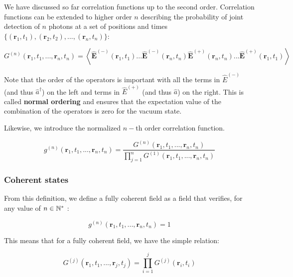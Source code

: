 We have discussed so far correlation functions up to the second order. Correlation functions can be extended to higher order $n$ describing the probability of joint detection of $n$ photons at a set of positions and times $\{(\bm{r}_1,t_1),(\bm{r}_2,t_2),...,(\bm{r}_n,t_n)\}$: 

\begin{equation}
    G^{(n)}\left(\bm{r}_{1}, t_{1}, ... , \bm{r}_{n}, t_{n}\right)=\left\langle \hat{\bm{E}}^{(-)}\left(\bm{r}_{1}, t_{1}\right) ... \hat{\bm{E}}^{(-)}\left(\bm{r}_{n}, t_{n}\right) \hat{\bm{E}}^{(+)}\left(\bm{r}_{n}, t_{n}\right) ... \hat{\bm{E}}^{(+)}\left(\bm{r}_{1}, t_{1}\right)\right\rangle
\end{equation}

\label{sec:normal_order}
\noindent Note that the order of the operators is important with all the terms in $\hat{E}^{(-)}$ (and thus $\hat{a}^{\dagger}$) on the left and terms in $\hat{E}^{(+)}$ (and thus $\hat{a}$) on the right. This is called \textbf{normal ordering} and ensures that the expectation value of the combination of the operators is zero for the vacuum state. 

Likewise, we introduce the normalized $n-$th order correlation function.

\begin{equation}
    g^{(n)}\left(\bm{r}_{1}, t_{1}, ...,  \bm{r}_{n}, t_{n}\right)=\frac{G^{(n)}\left(\bm{r}_{1}, t_{1}, ...,  \bm{r}_{n}, t_{n}\right)}{\displaystyle \prod_{j=1}^{n} G^{(1)}\left(\bm{r}_{1}, t_{1}, ..., \bm{r}_{n}, t_{n}\right)}
\end{equation}

\subsubsection{Coherent states}

\noindent From this definition, we define a fully coherent field as a field that verifies, for any value of $n \in \mathbb{N}^*$ \cite{glauber1963quantum}:

\begin{equation}
    g^{(n)}\left(\bm{r}_{1}, t_{1}, ...,  \bm{r}_{n}, t_{n}\right)  = 1
    \label{eq:cond_g_coherent}
\end{equation}

\noindent This means that for a fully coherent field, we have the simple relation:

\begin{equation}
    G^{(j)}\left(\bm{r}_{1}, t_{1}, ... , \bm{r}_{j}, t_{j}\right) = \prod_{i=1}^{j} G^{(j)}(\bm{r}_{i}, t_{i})
    \label{eq:cond_G_coherent}
\end{equation}

